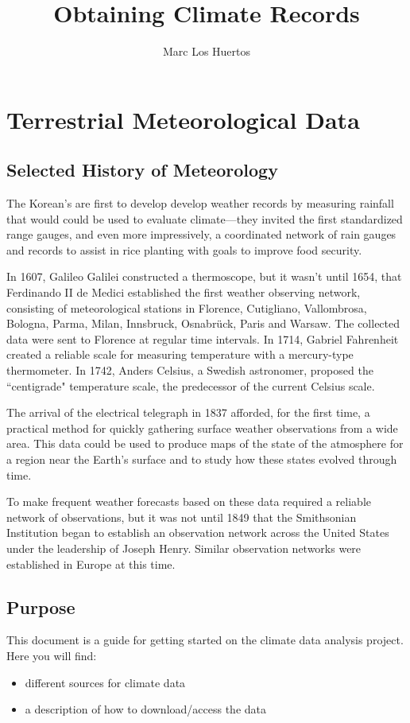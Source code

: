 \documentclass{article}\usepackage[]{graphicx}\usepackage[]{xcolor}
\title{Obtaining Climate Records}
\author{Marc Los Huertos}
\begin{document}
\maketitle

\section{Terrestrial Meteorological Data}

\subsection{Selected History of Meteorology}

The Korean's are first to develop develop weather records by measuring rainfall that would could be used to evaluate climate---they invited the first standardized range gauges, and even more impressively, a coordinated network of rain gauges and records to assist in rice planting with goals to improve food security.

In 1607, Galileo Galilei constructed a thermoscope, but it wasn't until 1654, that Ferdinando II de Medici established the first weather observing network, consisting of meteorological stations in Florence, Cutigliano, Vallombrosa, Bologna, Parma, Milan, Innsbruck, Osnabrück, Paris and Warsaw. The collected data were sent to Florence at regular time intervals. In 1714, Gabriel Fahrenheit created a reliable scale for measuring temperature with a mercury-type thermometer. In 1742, Anders Celsius, a Swedish astronomer, proposed the ``centigrade" temperature scale, the predecessor of the current Celsius scale.

The arrival of the electrical telegraph in 1837 afforded, for the first time, a practical method for quickly gathering surface weather observations from a wide area. This data could be used to produce maps of the state of the atmosphere for a region near the Earth's surface and to study how these states evolved through time. 

To make frequent weather forecasts based on these data required a reliable network of observations, but it was not until 1849 that the Smithsonian Institution began to establish an observation network across the United States under the leadership of Joseph Henry. Similar observation networks were established in Europe at this time. 

\subsection{Purpose}
This document is a guide for getting started on the climate data analysis project. Here you will find: 
\begin{itemize}
\item different sources for climate data
\item a description of how to download/access the data
\end{itemize}
\end{document}
